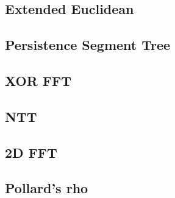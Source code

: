 \documentclass[10pt,landscape,a4paper,twocolumn]{article}
\begin{document}
\subsection{Extended Euclidean}


\subsection{Persistence Segment Tree}


\subsection{XOR FFT}


\subsection{NTT}


\subsection{2D FFT}


%
\subsection{Pollard's rho}


%
%
%


\end{document}
